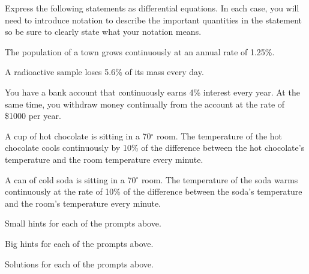 \begin{activity} \label{A:7.1.1}  Express the following statements as
  differential equations.  In each case, you will need to introduce notation
  to describe the important quantities in the statement so be sure to 
  clearly state what your notation means.
\ba
	\item The population of a town grows continuously at an annual rate of
          1.25\%. 
        \item A radioactive sample loses
          5.6\% of its mass every day.
        \item You have a bank account that continuously earns 4\% interest every
          year.  At the same time, you withdraw money continually from
          the account at the rate of \$1000 per year.
        \item A cup of hot chocolate is sitting in a 70$^\circ$ room.
          The temperature of the hot chocolate cools continuously by 10\% of
          the difference between the hot chocolate's temperature and
          the room temperature every minute.
        \item A can of cold soda is sitting in a 70$^\circ$ room.
          The temperature of the soda warms continuously at the rate of 10\% of
          the difference between the soda's temperature and
          the room's temperature every minute.
\ea
\end{activity}
\begin{smallhint}
\ba
	\item Small hints for each of the prompts above.
\ea
\end{smallhint}
\begin{bighint}
\ba
	\item Big hints for each of the prompts above.
\ea
\end{bighint}
\begin{activitySolution}
\ba
	\item Solutions for each of the prompts above.
\ea
\end{activitySolution}
\aftera